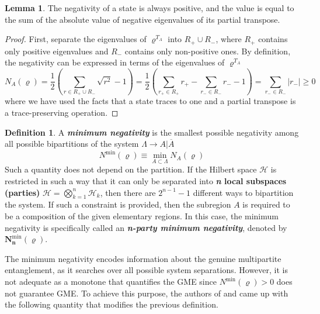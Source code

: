 \documentclass[12font]{article}
\numberwithin{equation}{section}    %
\theoremstyle{definition}
\newtheorem{definition}{Definition}[section]
\newtheorem{lemma}[theorem]{Lemma}
\newcommand{\lr}[1]{\left(  #1  \right)}
\newcommand{\abs}[1]{\left|  #1  \right|}
\newcommand{\mrm}[1]{\mathrm{#1}}
\begin{document}
\begin{lemma}\label{lemma:neg-compute}
    The negativity of a state is always positive, and the value is equal to the sum of the absolute value of negative eigenvalues of its partial transpose.
\end{lemma}
\begin{proof}
    First, separate the eigenvalues of $\varrho^{T_A}$ into $R_{+} \cup R_{-}$, where $R_{+}$ contains only positive eigenvalues and $R_{-}$ contains only non-positive ones. By definition, the negativity can be expressed in terms of the eigenvalues of $\varrho^{T_A}$
    \[
    N_A(\varrho) = \frac{1}{2}\lr{\sum_{r \in R_+\cup R_-}\sqrt{r^2} - 1} = \frac{1}{2}\lr{\sum_{r_+\in R_+} r_+ - \sum_{r_-\in R_-} r_- - 1 } = \sum_{r_- \in R_-} \abs{r_-} \geq 0
    \]
    where we have used the facts that a state traces to one and a partial transpose is a trace-preserving operation.
\end{proof}

\begin{definition}
    A \textbf{\textit{minimum negativity}} is the smallest possible negativity among all possible bipartitions of the system $\Lambda \to A|\overline{A}$
    \[
    N^{\mrm{min}}(\varrho) \equiv \min_{A \subset \Lambda} N_A(\varrho)
    \]
    Such a quantity does not depend on the partition. If the Hilbert space $\mathcal{H}$ is restricted in such a way that it can only be separated into \textbf{\textit{n} local subspaces (parties)} $\mathcal{H} = \bigotimes_{k=1}^{n}\mathcal{H}_k$, then there are $2^{n-1} - 1$ different ways to bipartition the system. If such a constraint is provided, then the subregion $A$ is required to be a composition of the given elementary regions. In this case, the minimum negativity is specifically called an \textbf{\textit{n-party minimum negativity}}, denoted by $\boldsymbol{N^{\mrm{min}}_n(\varrho)}$. 
\end{definition}

The minimum negativity encodes information about the genuine multipartite entanglement, as it searches over all possible system separations. However, it is not adequate as a monotone that quantifies the GME since $N^{\mrm{min}}(\varrho) > 0$ does not guarantee GME. To achieve this purpose, the authors of \cite{Jungnitsch-Moroder-Guhne_2011} and \cite{Lyu-Chandorkar-Kapoor-Takei-Sorensen-Witczak-Krempa_2026} came up with the following quantity that modifies the previous definition.
\end{document}
